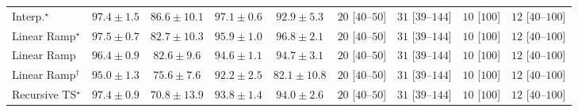 \begin{tabular}{l|cccc|cccc|}
Interp.$^\star$ & {\cellcolor[HTML]{782A05}} \color[HTML]{F1F1F1} $97.4\pm 1.5$ & {\cellcolor[HTML]{F5841E}} \color[HTML]{F1F1F1} $86.6\pm 10.1$ & {\cellcolor[HTML]{7C2C05}} \color[HTML]{F1F1F1} $97.1\pm 0.6$ & {\cellcolor[HTML]{BB4403}} \color[HTML]{F1F1F1} $92.9\pm 5.3$ & {\cellcolor[HTML]{FDE4E1}} \color[HTML]{000000} $20$ [$40$--$50$] & {\cellcolor[HTML]{FDD8D5}} \color[HTML]{000000} $31$ [$39$--$144$] & {\cellcolor[HTML]{FEEEEB}} \color[HTML]{000000} $10$ [$100$] & {\cellcolor[HTML]{FEECE9}} \color[HTML]{000000} $12$ [$40$--$100$] \\
Linear Ramp$^\star$ & {\cellcolor[HTML]{782A05}} \color[HTML]{F1F1F1} $97.5\pm 0.7$ & {\cellcolor[HTML]{FEB23F}} \color[HTML]{000000} $82.7\pm 10.3$ & {\cellcolor[HTML]{8E3104}} \color[HTML]{F1F1F1} $95.9\pm 1.0$ & {\cellcolor[HTML]{812D05}} \color[HTML]{F1F1F1} $96.8\pm 2.1$ & {\cellcolor[HTML]{FDE4E1}} \color[HTML]{000000} $20$ [$40$--$50$] & {\cellcolor[HTML]{FDD8D5}} \color[HTML]{000000} $31$ [$39$--$144$] & {\cellcolor[HTML]{FEEEEB}} \color[HTML]{000000} $10$ [$100$] & {\cellcolor[HTML]{FEECE9}} \color[HTML]{000000} $12$ [$40$--$100$] \\
Linear Ramp & {\cellcolor[HTML]{882F05}} \color[HTML]{F1F1F1} $96.4\pm 0.9$ & {\cellcolor[HTML]{FEB340}} \color[HTML]{000000} $82.6\pm 9.6$ & {\cellcolor[HTML]{A13804}} \color[HTML]{F1F1F1} $94.6\pm 1.1$ & {\cellcolor[HTML]{A03704}} \color[HTML]{F1F1F1} $94.7\pm 3.1$ & {\cellcolor[HTML]{FDE4E1}} \color[HTML]{000000} $20$ [$40$--$50$] & {\cellcolor[HTML]{FDD8D5}} \color[HTML]{000000} $31$ [$39$--$144$] & {\cellcolor[HTML]{FEEEEB}} \color[HTML]{000000} $10$ [$100$] & {\cellcolor[HTML]{FEECE9}} \color[HTML]{000000} $12$ [$40$--$100$] \\
Linear Ramp$^\dagger$ & {\cellcolor[HTML]{9B3504}} \color[HTML]{F1F1F1} $95.0\pm 1.3$ & {\cellcolor[HTML]{FFEFAC}} \color[HTML]{000000} $75.6\pm 7.6$ & {\cellcolor[HTML]{C44802}} \color[HTML]{F1F1F1} $92.2\pm 2.5$ & {\cellcolor[HTML]{FEBA46}} \color[HTML]{000000} $82.1\pm 10.8$ & {\cellcolor[HTML]{FDE4E1}} \color[HTML]{000000} $20$ [$40$--$50$] & {\cellcolor[HTML]{FDD8D5}} \color[HTML]{000000} $31$ [$39$--$144$] & {\cellcolor[HTML]{FEEEEB}} \color[HTML]{000000} $10$ [$100$] & {\cellcolor[HTML]{FEECE9}} \color[HTML]{000000} $12$ [$40$--$100$] \\
Recursive TS$^\star$ & {\cellcolor[HTML]{782A05}} \color[HTML]{F1F1F1} $97.4\pm 0.9$ & {\cellcolor[HTML]{FFFFE5}} \color[HTML]{000000} $70.8\pm 13.9$ & {\cellcolor[HTML]{AC3D03}} \color[HTML]{F1F1F1} $93.8\pm 1.4$ & {\cellcolor[HTML]{AB3C03}} \color[HTML]{F1F1F1} $94.0\pm 2.6$ & {\cellcolor[HTML]{FDE4E1}} \color[HTML]{000000} $20$ [$40$--$50$] & {\cellcolor[HTML]{FDD8D5}} \color[HTML]{000000} $31$ [$39$--$144$] & {\cellcolor[HTML]{FEEEEB}} \color[HTML]{000000} $10$ [$100$] & {\cellcolor[HTML]{FEECE9}} \color[HTML]{000000} $12$ [$40$--$100$] \\

\end{tabular}

